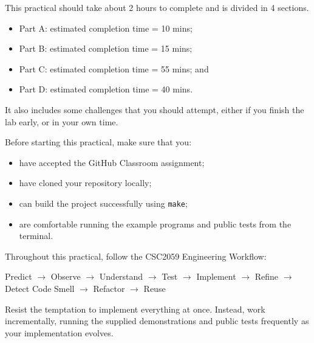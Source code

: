 \documentclass{csc2059practical}
\begin{document}
\begin{infobox}
This practical should take about 2 hours to complete and is divided in 4 sections.

\begin{itemize}
    \item Part A: estimated completion time = 10 mins;
    \item Part B: estimated completion time = 15 mins;
    \item Part C: estimated completion time = 55 mins; and
    \item Part D: estimated completion time = 40 mins.
\end{itemize}

It also includes some challenges that you should attempt, either if you finish the lab early, or in your own time. 

\end{infobox}



Before starting this practical, make sure that you:

\begin{itemize}
    \item have accepted the GitHub Classroom assignment;
    \item have cloned your repository locally;
    \item can build the project successfully using \texttt{make};
    \item are comfortable running the example programs and public tests from the terminal.
\end{itemize}

\begin{importantnote}
Throughout this practical, follow the CSC2059 Engineering Workflow:

\begin{center}
Predict $\rightarrow$ Observe $\rightarrow$ Understand $\rightarrow$ Test $\rightarrow$ Implement $\rightarrow$ Refine $\rightarrow$ Detect Code Smell $\rightarrow$ Refactor $\rightarrow$ Reuse
\end{center}

Resist the temptation to implement everything at once. Instead, work incrementally, running the supplied demonstrations and public tests frequently as your implementation evolves.
\end{importantnote}


\end{document}
